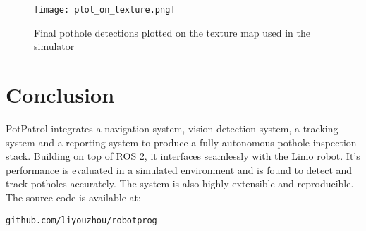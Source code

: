 \documentclass[conference]{IEEEtran}
\begin{document}
\begin{figure}[h]
    \centering
    \texttt{[image: plot\_on\_texture.png]}
    \caption{Final pothole detections plotted on the texture map used in the simulator}
    \label{fig:plot_on_texture}
\end{figure}

\section{Conclusion}

PotPatrol integrates a navigation system, vision detection system, a tracking system and a reporting system to produce a fully autonomous pothole inspection stack. Building on top of ROS 2, it interfaces seamlessly with the Limo robot. It's performance is evaluated in a simulated environment and is found to detect and track potholes accurately. The system is also highly extensible and reproducible. The source code is available at:

\verb|github.com/liyouzhou/robotprog|



\end{document}
